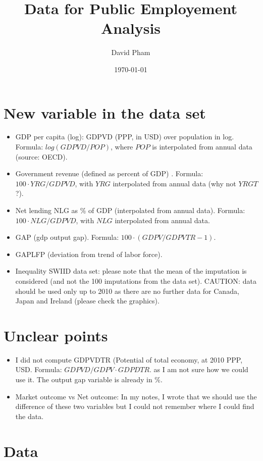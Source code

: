 \documentclass[11pt]{article}
\author{David Pham}
\date{\today}
\title{Data for Public Employement Analysis}
\begin{document}
\maketitle
\tableofcontents


\section{New variable in the data set}
\label{sec-1}

\begin{itemize}
\item GDP per capita (log): GDPVD (PPP, in USD) over population in log. Formula:
$log(GDPVD/POP)$, where $POP$ is interpolated from annual data (source: OECD).
\item Government revenue (defined as percent of GDP) . Formula: $100\cdot YRG/GDPVD$,
with $YRG$ interpolated from annual data (why not $YRGT$?).
\item Net lending NLG as \% of GDP (interpolated from annual data). Formula:
$100\cdot NLG/GDPVD$, with $NLG$ interpolated from annual data.
\item GAP (gdp output gap). Formula: $100 \cdot (GDPV/GDPVTR-1)$.
\item GAPLFP (deviation from trend of labor force).
\item Inequality SWIID data set: please note that the mean of the imputation is
considered (and not the 100 imputations from the data set). CAUTION: data
should be used only up to 2010 as there are no further data for Canada, Japan
and Ireland (please check the graphics).
\end{itemize}

\section{Unclear points}
\label{sec-2}

\begin{itemize}
\item I did not compute GDPVDTR (Potential of total economy, at 2010 PPP,
USD. Formula: $GDPVD/GDPV \cdot GDPDTR$. as I am not sure how we could use
it. The output gap variable is already in \%.
\item Market outcome vs Net outcome: In my notes, I wrote that we should use
the difference of these two variables but I could not remember where I could
find the data.
\end{itemize}

\section{Data}
\label{sec-3}
\end{document}
